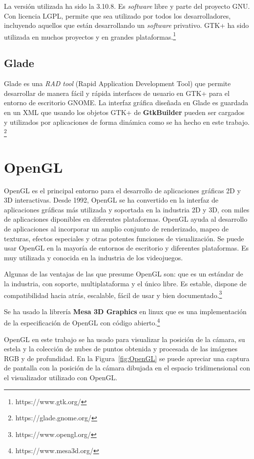 La versión utilizada ha sido la 3.10.8. Es \textit{software} libre y parte del proyecto GNU. Con licencia LGPL, permite que sea utilizado por todos los desarrolladores, incluyendo aquellos que están desarrollando un  \textit{software} privativo. GTK+ ha sido utilizada en muchos proyectos y en grandes plataformas.\footnote{https://www.gtk.org/}

\subsection{Glade}
Glade es una \textit{RAD tool} (Rapid Application Development Tool) que permite desarrollar de manera fácil y rápida interfaces de usuario en GTK+ para el entorno de escritorio GNOME. La interfaz gráfica diseñada en Glade es guardada en un XML que usando los objetos GTK+ de \textbf{GtkBuilder} pueden ser cargados y utilizados por aplicaciones de forma dinámica como se ha hecho en este trabajo. \footnote{https://glade.gnome.org/}
\section{OpenGL}
OpenGL es el principal entorno para el desarrollo de aplicaciones gráficas 2D y 3D interactivas. Desde 1992, OpenGL se ha convertido en la interfaz de aplicaciones gráficas más utilizada y soportada en la industria 2D y 3D, con miles de aplicaciones diponibles en diferentes plataformas. OpenGL ayuda al desarrollo de aplicaciones al incorporar un amplio conjunto de renderizado, mapeo de texturas, efectos especiales y otras potentes funciones de visualización. Se puede usar OpenGL en la mayoría de entornos de escritorio y diferentes plataformas. Es muy utilizada y conocida en la industria de los videojuegos.

Algunas de las ventajas de las que presume OpenGL son: que es un estándar de la industria, con soporte, multiplataforma y el único libre. Es estable, dispone de compatibilidad hacia atrás, escalable, fácil de usar y bien documentado.\footnote{https://www.opengl.org/}

Se ha usado la librería \textbf{Mesa 3D Graphics} en linux que es una implementación de la especificación de OpenGL con código abierto.\footnote{https://www.mesa3d.org/}

OpenGL en este trabajo se ha usado para visualizar la posición de la cámara, su estela y la colección de nubes de puntos obtenida y procesada de las imágenes RGB y de profundidad. En la Figura~\ref{fig:OpenGL} se puede apreciar una captura de pantalla con la posición de la cámara dibujada en el espacio tridimensional con el visualizador utilizado con OpenGL.

